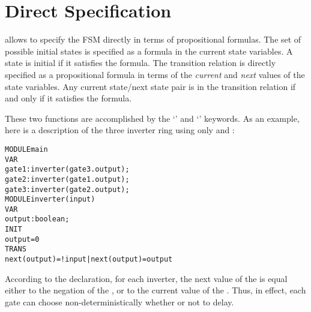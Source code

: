 \section{Direct Specification}
\label{Direct Specification}

\nusmv allows to specify the FSM directly in terms of
propositional formulas. The set of possible initial states is specified
as a formula in the current state variables. A state is initial if it
satisfies the formula. The transition relation is directly specified as
a propositional formula in terms of the \emph{current} and \emph{next}
values of the state variables. Any current state/next state pair is in
the transition relation if and only if it satisfies the formula.

These two functions are accomplished by the `' and `'
keywords. As an example, here is a description of the three inverter
ring using only  and :\\
\begin{alltt}
MODULE main
 VAR
   gate1 : inverter(gate3.output);
   gate2 : inverter(gate1.output);
   gate3 : inverter(gate2.output);
MODULE inverter(input)
 VAR
   output : boolean;
 INIT
   output = 0
 TRANS
   next(output) = !input | next(output) = output
\end{alltt}

According to the  declaration, for each inverter,
the next value of the  is equal either to the negation of
the , or to the current value of the . Thus, in
effect, each gate can choose non-deterministically whether or not to
delay.

